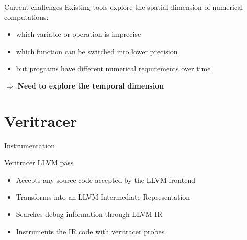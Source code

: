 \documentclass[10pt]{beamer}
\begin{document}
\begin{frame}{Current challenges}
Existing tools explore the \alert{spatial} dimension of numerical computations:
\begin{itemize}
\item which variable or operation is imprecise
\item which function can be switched into lower precision
\item but programs have different numerical requirements over time
\end{itemize}
\begin{center}
\begin{large}
$\Rightarrow$ \textbf{Need to explore the \alert{temporal} dimension}
\end{large}
\end{center}
\end{frame}

\section{Veritracer}

\begin{frame}[fragile]{Instrumentation}
\begin{alertblock}{Veritracer LLVM pass}
\begin{itemize}
\item Accepts any source code accepted by the LLVM frontend
\item Transforms into an LLVM Intermediate Representation
\item Searches debug information through LLVM IR
\item Instruments the IR code with veritracer probes
\end{itemize}
\end{alertblock}
\begin{figure}
\end{figure}
\end{frame}
\end{document}
